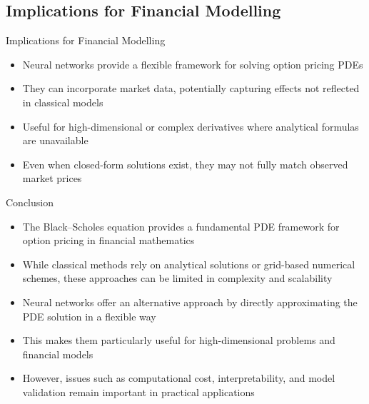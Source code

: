 \subsection{Implications for Financial Modelling}

\begin{frame}{Implications for Financial Modelling}

\begin{itemize}
\item Neural networks provide a flexible framework for solving option pricing PDEs
\item They can incorporate market data, potentially capturing effects not reflected in classical models
\item Useful for high-dimensional or complex derivatives where analytical formulas are unavailable
\item Even when closed-form solutions exist, they may not fully match observed market prices
\end{itemize}

\end{frame}

\begin{frame}{Conclusion}

\begin{itemize}
\item The Black--Scholes equation provides a fundamental PDE framework for option pricing in financial mathematics
\item While classical methods rely on analytical solutions or grid-based numerical schemes, these approaches can be limited in complexity and scalability
\item Neural networks offer an alternative approach by directly approximating the PDE solution in a flexible way
\item This makes them particularly useful for high-dimensional problems and financial models
\item However, issues such as computational cost, interpretability, and model validation remain important in practical applications
\end{itemize}

\vspace{0.3cm}

\end{frame}
